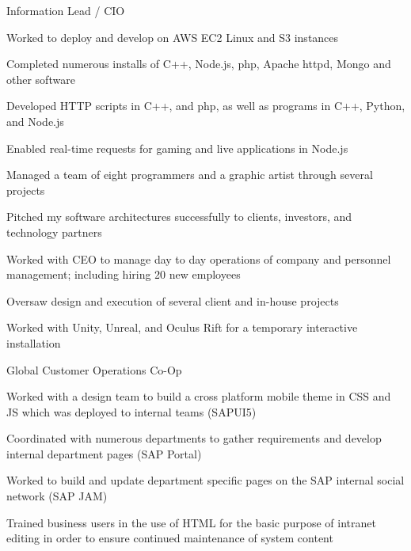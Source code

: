 \documentclass[]{alpha-cv}
\begin{document}
            {}
            {Information Lead / CIO}
            {\begin{itemize}{
                \item{Worked to deploy and develop on AWS EC2 Linux and S3 instances
                    \begin{itemize}{
                        \item{Completed numerous installs of C++, Node.js, php, Apache httpd, Mongo and other software}
                        \item{Developed HTTP scripts in C++, and php, as well as programs in C++, Python, and Node.js}
                        \item{Enabled real-time requests for gaming and live applications in Node.js}}\end{itemize}
                    }
                \item{Managed a team of eight programmers and a graphic artist through several projects}
                \item{Pitched my software architectures successfully to clients, investors, and technology partners}
                \item{Worked with CEO to manage day to day operations of company and personnel management; including hiring 20 new employees}
                \item{Oversaw design and execution of several client and in-house projects}
                \item{Worked with Unity, Unreal, and Oculus Rift for a temporary interactive installation}}
            \end{itemize}}
           
            
            {}
            {Global Customer Operations Co-Op}
            {\begin{itemize}{     
                \item{Worked with a design team to build a cross platform mobile theme in CSS and JS which was deployed to internal teams (SAPUI5)}
                \item{Coordinated with numerous departments to gather requirements and develop internal department pages (SAP Portal)}
                \item{Worked to build and update department specific pages on the SAP internal social network (SAP JAM)}
                \item{Trained business users in the use of HTML for the basic purpose of intranet editing in order to ensure continued maintenance of system content}
            }
            \end{itemize}}
            
\end{document}
